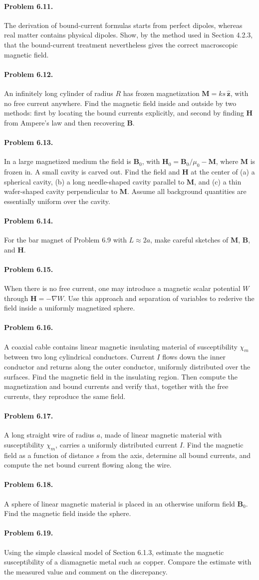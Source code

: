 \documentclass{aa}
\newcommand{\problemstatement}[2]{%
\paragraph{Problem #1.}#2\par\medskip
}
\begin{document}
\problemstatement{6.11}{The derivation of bound-current formulas starts from perfect dipoles, whereas real matter contains physical dipoles. Show, by the method used in Section 4.2.3, that the bound-current treatment nevertheless gives the correct macroscopic magnetic field.}
\problemstatement{6.12}{An infinitely long cylinder of radius \(R\) has frozen magnetization \(\mathbf M = ks\,\hat{\mathbf z}\), with no free current anywhere. Find the magnetic field inside and outside by two methods: first by locating the bound currents explicitly, and second by finding \(\mathbf H\) from Ampere's law and then recovering \(\mathbf B\).}
\problemstatement{6.13}{In a large magnetized medium the field is \(\mathbf B_0\), with \(\mathbf H_0 = \mathbf B_0/\mu_0 - \mathbf M\), where \(\mathbf M\) is frozen in. A small cavity is carved out. Find the field and \(\mathbf H\) at the center of (a) a spherical cavity, (b) a long needle-shaped cavity parallel to \(\mathbf M\), and (c) a thin wafer-shaped cavity perpendicular to \(\mathbf M\). Assume all background quantities are essentially uniform over the cavity.}
\problemstatement{6.14}{For the bar magnet of Problem 6.9 with \(L\approx 2a\), make careful sketches of \(\mathbf M\), \(\mathbf B\), and \(\mathbf H\).}
\problemstatement{6.15}{When there is no free current, one may introduce a magnetic scalar potential \(W\) through \(\mathbf H = -\nabla W\). Use this approach and separation of variables to rederive the field inside a uniformly magnetized sphere.}
\problemstatement{6.16}{A coaxial cable contains linear magnetic insulating material of susceptibility \(\chi_m\) between two long cylindrical conductors. Current \(I\) flows down the inner conductor and returns along the outer conductor, uniformly distributed over the surfaces. Find the magnetic field in the insulating region. Then compute the magnetization and bound currents and verify that, together with the free currents, they reproduce the same field.}
\problemstatement{6.17}{A long straight wire of radius \(a\), made of linear magnetic material with susceptibility \(\chi_m\), carries a uniformly distributed current \(I\). Find the magnetic field as a function of distance \(s\) from the axis, determine all bound currents, and compute the net bound current flowing along the wire.}
\problemstatement{6.18}{A sphere of linear magnetic material is placed in an otherwise uniform field \(\mathbf B_0\). Find the magnetic field inside the sphere.}
\problemstatement{6.19}{Using the simple classical model of Section 6.1.3, estimate the magnetic susceptibility of a diamagnetic metal such as copper. Compare the estimate with the measured value and comment on the discrepancy.}
\end{document}
